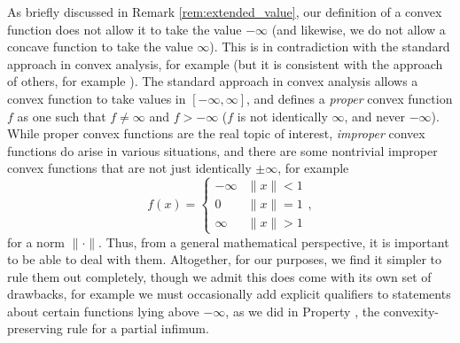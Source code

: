 As briefly discussed in Remark \ref{rem:extended_value}, our definition of a
convex function does not allow it to take the value $-\infty$ (and likewise, we
do not allow a concave function to take the value $\infty$). This is in
contradiction with the standard approach in convex analysis, for example
\cite{rockafellar1970convex, bertsekas2009convex} (but it is consistent with 
the approach of others, for example \cite{boyd2004convex}). The standard
approach in convex analysis allows a convex function to take values in
$[-\infty,\infty]$, and defines a \emph{proper} convex function $f$ as one
such that $f \not= \infty$ and $f > -\infty$ ($f$ is not identically $\infty$,
and never $-\infty$). While proper convex functions are the real topic of
interest, \emph{improper} convex functions do arise in various situations, and
there are some nontrivial improper convex functions that are not just
identically $\pm \infty$, for example
\[
f(x) = \begin{cases}
-\infty & \|x\| < 1 \\
0 & \|x\| = 1 \\
\infty & \|x\| > 1
\end{cases},
\]
for a norm $\|\cdot\|$. Thus, from a general mathematical perspective, it is
important to be able to deal with them. Altogether, for our purposes, we find it
simpler to rule them out completely, though we admit this does come with its own
set of drawbacks, for example we must occasionally add explicit qualifiers to
statements about certain functions lying above $-\infty$, as we did in Property 
, the convexity-preserving rule for a partial
infimum.

\clearpage

